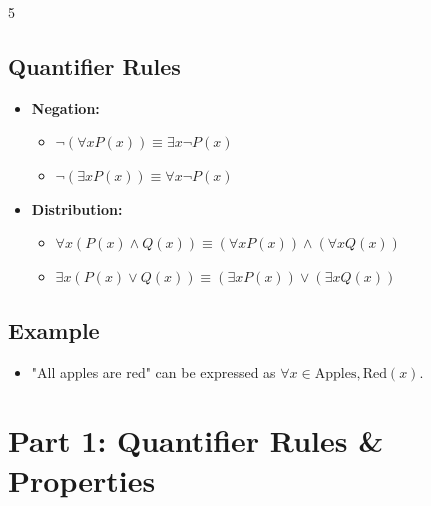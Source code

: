 \documentclass[a4paper,landscape]{article}
\begin{document}
\begin{multicols*}{5}
\subsection*{Quantifier Rules}
\begin{itemize}[leftmargin=*, itemsep=0pt]
    \item \textbf{Negation:}
    \begin{itemize}[leftmargin=*, itemsep=0pt]
        \item $\neg(\forall x P(x)) \equiv \exists x \neg P(x)$
        \item $\neg(\exists x P(x)) \equiv \forall x \neg P(x)$
    \end{itemize}
    \item \textbf{Distribution:}
    \begin{itemize}[leftmargin=*, itemsep=0pt]
        \item $\forall x(P(x) \wedge Q(x)) \equiv (\forall xP(x)) \wedge (\forall xQ(x))$
        \item $\exists x(P(x) \vee Q(x)) \equiv (\exists xP(x)) \vee (\exists xQ(x))$
    \end{itemize}
\end{itemize}

\subsection*{Example}
\begin{itemize}[leftmargin=*, itemsep=0pt]
    \item "All apples are red" can be expressed as $\forall x \in \text{Apples}, \text{Red}(x)$.
\end{itemize}


\section*{Part 1: Quantifier Rules \& Properties}


\end{multicols*}
\end{document}
